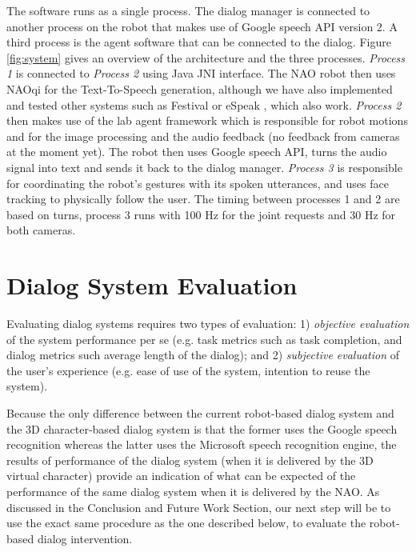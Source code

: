 \documentclass[letterpaper]{article}
\begin{document}
\begin{inparaenum}[1)]
The software runs as a single process. The
dialog manager is connected to another process on the robot that makes use of Google speech API 
version 2. 
A third process is 
the agent software that can be connected to the dialog. Figure \ref{fig:system} gives an 
overview of the architecture and the three processes. {\em Process 1} is connected to {\em Process 2} using 
Java JNI interface.  The NAO robot then uses NAOqi for the Text-To-Speech 
generation, although we have also implemented and tested other systems such as Festival 
\cite{taylor1998architecture} or eSpeak \cite{eSpeak}, which  also work. {\em Process 2} then makes 
use of the lab agent framework which is responsible for robot motions and 
for the image processing and the audio feedback (no feedback from cameras at the moment yet). The 
robot then uses Google speech API, turns the audio signal into text and sends it back to the dialog 
manager. {\em Process 3} is responsible for coordinating the robot's gestures with its spoken utterances, and uses face tracking to physically follow the user.  The timing between processes 1 and 2 are based on turns, process 3 runs with 100 Hz for the 
joint requests and 30 Hz for both cameras.

\section*{Dialog System Evaluation}

Evaluating dialog systems requires two types of evaluation: 1) {\em objective evaluation} of the system performance per se (e.g. task metrics such as task completion, and dialog metrics such average length of the dialog); and 2) {\em subjective evaluation} of the user's experience (e.g. ease of use of the system, intention to reuse the system).

Because the only difference between the current robot-based dialog system and the 3D character-based dialog system \cite{YASCLL14} is that the former uses the Google speech recognition whereas the latter uses the Microsoft speech recognition engine, the results of performance of the dialog system (when it is delivered by the 3D virtual character) provide an indication of what can be expected of the performance of the same dialog system when it is delivered by the NAO.  As discussed in the Conclusion and Future Work Section, our next step will be to use the exact same procedure as the one described below, to evaluate the robot-based dialog intervention.


\end{inparaenum}
\end{document}
